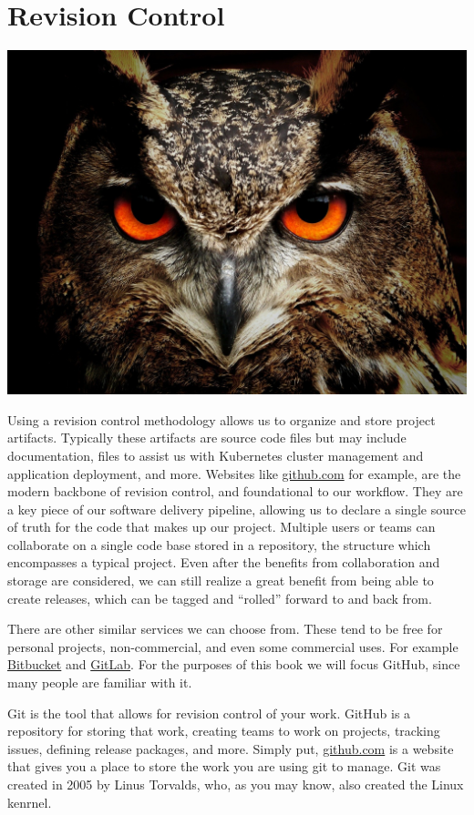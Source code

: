 \chapter{Revision Control}
\includegraphics[scale=0.20]{images/owl-50267_1920.jpg}

\justify{}
Using a revision control methodology allows us to organize and store project artifacts. Typically these 
artifacts are source code files but may include documentation, files to assist us with Kubernetes cluster management and application
deployment, and more. Websites like \href{https://github.com}{github.com} for example, are the modern
backbone of revision control, and foundational to our workflow. They are a key piece of our software delivery pipeline,
allowing us to declare a single source of truth for the code that makes up our project. Multiple users or teams can collaborate on a
single code base stored in a repository, the structure which encompasses a typical project. Even after the benefits from collaboration and
storage are considered, we can still realize a great benefit from being able to create releases, which can be tagged and ``rolled''
forward to and back from.

\justify{}
There are other similar services we can choose from. These tend to be free for personal projects, non-commercial, and even some commercial
uses. For example \href{https://bitbucket.org/product}{Bitbucket} and \href{https://about.gitlab.com/}{GitLab}. For the purposes of this
book we will focus GitHub, since many people are familiar with it.

\justify{}
Git is the tool that allows for revision control of your work. GitHub is a repository for storing that work, creating
teams to work on projects, tracking issues, defining release packages, and more. Simply put, \href{github.com}{github.com}
is a website that gives you a place to store the work you are using git to manage. Git was created in 2005 by
Linus Torvalds, who, as you may know, also created the Linux kenrnel.


